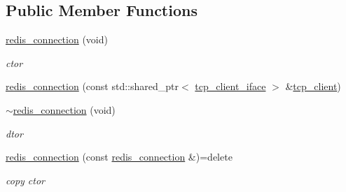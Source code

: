 \subsection*{Public Member Functions}
\begin{DoxyCompactItemize}
\item 
\mbox{\label{classcpp__redis_1_1network_1_1redis__connection_aee0302e4ff9c9b5b2e7f467d869d45f7}} 
\mbox{\hyperlink{classcpp__redis_1_1network_1_1redis__connection_aee0302e4ff9c9b5b2e7f467d869d45f7}{redis\+\_\+connection}} (void)
\begin{DoxyCompactList}\small\item\em ctor \end{DoxyCompactList}\item 
\mbox{\hyperlink{classcpp__redis_1_1network_1_1redis__connection_a6880cfb2e1b037fcdaa5f0a6d515b375}{redis\+\_\+connection}} (const std\+::shared\+\_\+ptr$<$ \mbox{\hyperlink{classcpp__redis_1_1network_1_1tcp__client__iface}{tcp\+\_\+client\+\_\+iface}} $>$ \&\mbox{\hyperlink{classcpp__redis_1_1network_1_1tcp__client}{tcp\+\_\+client}})
\item 
\mbox{\label{classcpp__redis_1_1network_1_1redis__connection_a9d392191ce262eddd5570b57e07aa051}} 
\mbox{\hyperlink{classcpp__redis_1_1network_1_1redis__connection_a9d392191ce262eddd5570b57e07aa051}{$\sim$redis\+\_\+connection}} (void)
\begin{DoxyCompactList}\small\item\em dtor \end{DoxyCompactList}\item 
\mbox{\label{classcpp__redis_1_1network_1_1redis__connection_a2bdd38bbfd5d97aeca8e433465c4d621}} 
\mbox{\hyperlink{classcpp__redis_1_1network_1_1redis__connection_a2bdd38bbfd5d97aeca8e433465c4d621}{redis\+\_\+connection}} (const \mbox{\hyperlink{classcpp__redis_1_1network_1_1redis__connection}{redis\+\_\+connection}} \&)=delete
\begin{DoxyCompactList}\small\item\em copy ctor \end{DoxyCompactList}\item 
\mbox{\label{classcpp__redis_1_1network_1_1redis__connection_a54a4c28ad1b9e9f3bac2854fddf4e30d}} 

\end{DoxyCompactItemize}
